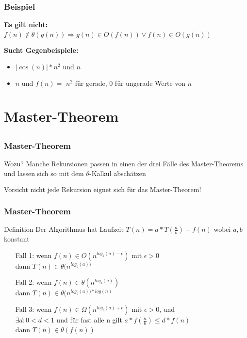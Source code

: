 \begin{frame}
			\frametitle{Beispiel}
		\begin{block}{\bf Es gilt nicht:}
		$f(n) \not\in \theta(g(n)) \Rightarrow g(n) \in O(f(n)) \vee f(n) \in O(g(n))$
		\end{block}

		\begin{block}{\bf Sucht Gegenbeispiele:}
		\begin{itemize}\pause
			\item $|\cos(n)| * n^2$ und \pause $n$
			\item $n$ und \pause $f(n)=$ $n^2$ für gerade, $0$ für ungerade Werte von $n$
		\end{itemize}
		\end{block}
\end{frame}

\section{Master-Theorem}
\subsection*{}
\begin{frame}
  \frametitle{Master-Theorem}

  \begin{block}{Wozu?}
    Manche Rekursionen passen in einen der drei Fälle des Master-Theorems und lassen sich so mit dem $\theta$-Kalkül abschätzen
  \end{block}
  \pause
  \begin{block}{Vorsicht}
    nicht jede Rekursion eignet sich für das Master-Theorem!
  \end{block}
\end{frame}

\begin{frame}
  \frametitle{Master-Theorem}

  \begin{block}{Definition}
   Der Algorithmus hat Laufzeit $T(n) = a*T(\frac{n}{b}) + f(n)$ wobei $a, b$ konstant
    \begin{itemize}
      \item[Fall 1:] wenn $f(n)  \in O(n^{log_b (a) -\epsilon})$ mit $\epsilon>0$ \\
      dann $T(n) \in \theta (n^{log_b (a))}$
      \item[Fall 2:] wenn $f(n)  \in \theta(n^{log_b (a)})$ \\
      dann $T(n) \in \theta (n^{log_b (a)) * log(n)}$
      \item[Fall 3:] wenn $f(n)  \in \Omega(n^{log_b (a) +\epsilon})$ mit $\epsilon>0$, und \\
      $\exists d: 0<d<1$ und für fast alle n gilt $a*f(\frac{n}{b}) \leq d*f(n)$  \\
      dann $T(n) \in \theta (f(n))$
    \end{itemize}
  \end{block}
\end{frame}

